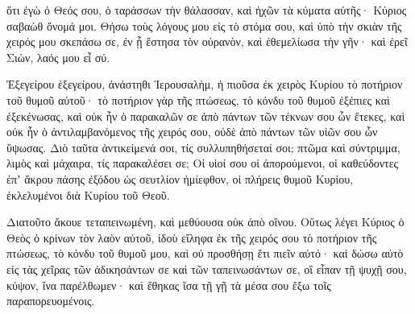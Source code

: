 {ὅτι ἐγὼ ὁ Θεός σου, ὁ ταράσσων τὴν θάλασσαν, καὶ ἠχῶν τὰ κύματα αὐτῆς· Κύριος σαβαὼθ ὄνομά μοι.
Θήσω τοὺς λόγους μου εἰς τὸ στόμα σου, καὶ ὑπὸ τὴν σκιὰν τῆς χειρός μου σκεπάσω σε, ἐν ᾗ ἔστησα τὸν οὐρανὸν, καὶ ἐθεμελίωσα τὴν γῆν· καὶ ἐρεῖ Σιὼν, λαός μου εἶ σύ.
\par }{\PP {}Ἐξεγείρου ἐξεγείρου, ἀνάστηθι Ἱερουσαλὴμ, ἡ πιοῦσα ἐκ χειρὸς Κυρίου τὸ ποτήριον τοῦ θυμοῦ αὐτοῦ· τὸ ποτήριον γὰρ τῆς πτώσεως, τὸ κόνδυ τοῦ θυμοῦ ἐξέπιες καὶ ἐξεκένωσας,
καὶ οὐκ ἦν ὁ παρακαλῶν σε ἀπὸ πάντων τῶν τέκνων σου ὧν ἔτεκες, καὶ οὐκ ἦν ὁ ἀντιλαμβανόμενος τῆς χειρός σου, οὐδὲ ἀπὸ πάντων τῶν υἱῶν σου ὧν ὕψωσας.
Διὸ ταῦτα ἀντικείμενά σοι, τίς συλλυπηθήσεταί σοι; πτῶμα καὶ σύντριμμα, λιμὸς καὶ μάχαιρα, τίς παρακαλέσει σε;
Οἱ υἱοί σου οἱ ἀπορούμενοι, οἱ καθεύδοντες ἐπʼ ἄκρου πάσης ἐξόδου ὡς σευτλίον ἡμίεφθον, οἱ πλήρεις θυμοῦ Κυρίου, ἐκλελυμένοι διὰ Κυρίου τοῦ Θεοῦ.
\par }{\PP {}Διατοῦτο ἄκουε τεταπεινωμένη, καὶ μεθύουσα οὐκ ἀπὸ οἴνου.
Οὕτως λέγει Κύριος ὁ Θεὸς ὁ κρίνων τὸν λαὸν αὐτοῦ, ἰδοὺ εἴληφα ἐκ τῆς χειρός σου τὸ ποτήριον τῆς πτώσεως, τὸ κόνδυ τοῦ θυμοῦ μου, καὶ οὐ προσθήσῃ ἔτι πιεῖν αὐτό·
καὶ δώσω αὐτὸ εἰς τὰς χεῖρας τῶν ἀδικησάντων σε καὶ τῶν ταπεινωσάντων σε, οἳ εἶπαν τῇ ψυχῇ σου, κύψον, ἵνα παρέλθωμεν· καὶ ἔθηκας ἴσα τῇ γῇ τὰ μέσα σου ἔξω τοῖς παραπορευομένοις.

}
